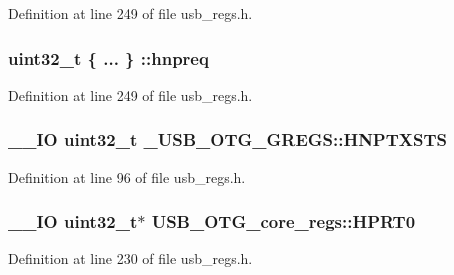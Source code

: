 Definition at line 249 of file usb\-\_\-regs.\-h.

\hypertarget{group___u_s_b___o_t_g___d_r_i_v_e_r_gaa3222d65e603dd391e9fad3f622a9e76}{
\subsubsection[{hnpreq}]{\setlength{\rightskip}{0pt plus 5cm}uint32\-\_\-t \{ ... \} \-::hnpreq}}\label{group___u_s_b___o_t_g___d_r_i_v_e_r_gaa3222d65e603dd391e9fad3f622a9e76}


Definition at line 249 of file usb\-\_\-regs.\-h.

\hypertarget{group___u_s_b___o_t_g___d_r_i_v_e_r_gac1bd7b9938b77197bb2c94599ba086d4}{
\subsubsection[{H\-N\-P\-T\-X\-S\-T\-S}]{\setlength{\rightskip}{0pt plus 5cm}\-\_\-\-\_\-\-I\-O {\bf uint32\-\_\-t} \-\_\-\-U\-S\-B\-\_\-\-O\-T\-G\-\_\-\-G\-R\-E\-G\-S\-::\-H\-N\-P\-T\-X\-S\-T\-S}}\label{group___u_s_b___o_t_g___d_r_i_v_e_r_gac1bd7b9938b77197bb2c94599ba086d4}


Definition at line 96 of file usb\-\_\-regs.\-h.

\hypertarget{group___u_s_b___o_t_g___d_r_i_v_e_r_gad1f621c1434b61b89b306a5f3f9e1125}{
\subsubsection[{H\-P\-R\-T0}]{\setlength{\rightskip}{0pt plus 5cm}\-\_\-\-\_\-\-I\-O {\bf uint32\-\_\-t}$\ast$ U\-S\-B\-\_\-\-O\-T\-G\-\_\-core\-\_\-regs\-::\-H\-P\-R\-T0}}\label{group___u_s_b___o_t_g___d_r_i_v_e_r_gad1f621c1434b61b89b306a5f3f9e1125}


Definition at line 230 of file usb\-\_\-regs.\-h.

